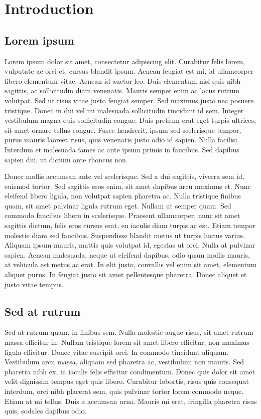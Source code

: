\section{Introduction}
\subsection{Lorem ipsum}
Lorem ipsum dolor sit amet, consectetur adipiscing elit. Curabitur felis lorem, vulputate 
ac orci et, cursus blandit ipsum. Aenean feugiat est mi, id ullamcorper libero elementum vitae. 
Aenean id auctor leo. Duis elementum nisl quis nibh sagittis, ac sollicitudin diam venenatis. 
Mauris semper enim ac lacus rutrum volutpat. Sed ut risus vitae justo feugiat semper. 
Sed maximus justo nec posuere tristique. Donec in dui vel mi malesuada sollicitudin tincidunt id sem. 
Integer vestibulum magna quis sollicitudin congue. Duis pretium erat eget turpis ultrices, 
sit amet ornare tellus congue. Fusce hendrerit, ipsum sed scelerisque tempor, purus mauris laoreet risus, 
quis venenatis justo odio id sapien. Nulla facilisi. Interdum et malesuada fames ac ante ipsum 
primis in faucibus. Sed dapibus sapien dui, ut dictum ante rhoncus non.

Donec mollis accumsan ante vel scelerisque. Sed a dui sagittis, 
viverra sem id, euismod tortor. Sed sagittis eros enim, sit amet dapibus arcu maximus et. 
Nunc eleifend libero ligula, non volutpat sapien pharetra ac. Nulla tristique finibus quam, 
sit amet pulvinar ligula rutrum eget. Nullam ut semper quam. Sed commodo faucibus libero in scelerisque. 
Praesent ullamcorper, nunc sit amet sagittis dictum, felis eros cursus erat, 
eu iaculis diam turpis ac est. Etiam tempor molestie diam sed faucibus. 
Suspendisse blandit metus ut turpis luctus varius. Aliquam ipsum mauris, mattis quis volutpat id, 
egestas ut orci. Nulla at pulvinar sapien. Aenean malesuada, neque ut eleifend dapibus, 
odio quam mollis mauris, at vehicula est metus ac erat. In elit justo, convallis vel enim sit amet, 
elementum aliquet purus. In feugiat justo sit amet pellentesque pharetra. 
Donec aliquet et justo vitae tempus.

\subsection{Sed at rutrum}
Sed at rutrum quam, in finibus sem. Nulla molestie augue risus, sit amet rutrum massa efficitur in. 
Nullam tristique lorem sit amet libero efficitur, non maximus ligula efficitur. 
Donec vitae suscipit orci. In commodo tincidunt aliquam. Vestibulum arcu massa, aliquam sed pharetra ac, 
vestibulum non mauris. Sed pharetra nibh ex, in iaculis felis efficitur condimentum. 
Donec quis dolor sit amet velit dignissim tempus eget quis libero. Curabitur lobortis, 
risus quis consequat interdum, orci nibh placerat sem, quis pulvinar tortor lorem commodo neque. 
Etiam at mi tellus. Duis a accumsan urna. Mauris mi erat, fringilla pharetra risus quis, 
sodales dapibus odio.

